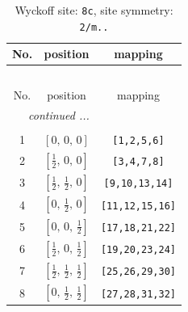 \documentclass[fleqn,8pt]{jsarticle}
\begin{document}
\begin{longtable}{ccc}
\caption{Wyckoff site: {\tt 8c}, site symmetry: {\tt 2/m..}}
 \\
 \hline \hline
No. & position & mapping \\ \hline \endfirsthead

\multicolumn{2}{l}{\tablename\ \thetable{}} \\
 \hline \hline
No. & position & mapping \\ \hline \endhead

 \hline \hline
\multicolumn{2}{r}{\footnotesize\it continued ...} \\ \endfoot

 \hline \hline
\multicolumn{2}{r}{} \\ \endlastfoot

1 & $\left[ 0,\, 0,\, 0 \right]$ & {\tt [1,2,5,6]} \\ \hline
2 & $\left[ \frac{1}{2},\, 0,\, 0 \right]$ & {\tt [3,4,7,8]} \\ \hline
3 & $\left[ \frac{1}{2},\, \frac{1}{2},\, 0 \right]$ & {\tt [9,10,13,14]} \\ \hline
4 & $\left[ 0,\, \frac{1}{2},\, 0 \right]$ & {\tt [11,12,15,16]} \\ \hline
5 & $\left[ 0,\, 0,\, \frac{1}{2} \right]$ & {\tt [17,18,21,22]} \\ \hline
6 & $\left[ \frac{1}{2},\, 0,\, \frac{1}{2} \right]$ & {\tt [19,20,23,24]} \\ \hline
7 & $\left[ \frac{1}{2},\, \frac{1}{2},\, \frac{1}{2} \right]$ & {\tt [25,26,29,30]} \\ \hline
8 & $\left[ 0,\, \frac{1}{2},\, \frac{1}{2} \right]$ & {\tt [27,28,31,32]} \\
\end{longtable}
\renewcommand{\arraystretch}{1.2}
\end{document}
